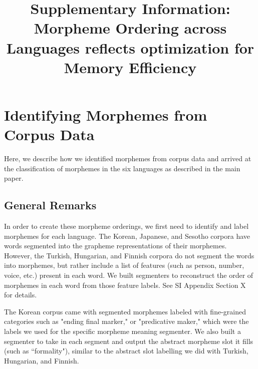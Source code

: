 \documentclass[11pt,letterpaper]{article}
\title{Supplementary Information: Morpheme Ordering across Languages reflects optimization for Memory Efficiency}
\newcommand\mhahn[1]{{\color{red}(#1)}}
\begin{document}
\maketitle

\tableofcontents





\section{Identifying Morphemes from Corpus Data}

Here, we describe how we identified morphemes from corpus data and arrived at the classification of morphemes in the six languages as described in the main paper.

\subsection{General Remarks}
In order to create these morpheme orderings, we first need to identify and label morphemes for each language. The Korean, Japanese, and Sesotho corpora have words segmented into the grapheme representations of their morphemes. However, the Turkish, Hungarian, and Finnish corpora do not segment the words into morphemes, but rather include a list of features (such as person, number, voice, etc.) present in each word. We built segmenters to reconstruct the order of morphemes in each word from those feature labels. See SI Appendix Section X for details.
%
%

    The Korean corpus came with segmented morphemes labeled with fine-grained categories such as "ending final marker," or "predicative maker," which were the labels we used for the specific morpheme meaning segmenter. We also built a segmenter to take in each segment and output the abstract morpheme slot it fills (such as ``formality"), similar to the abstract slot labelling we did with Turkish, Hungarian, and Finnish. 
%
\end{document}
